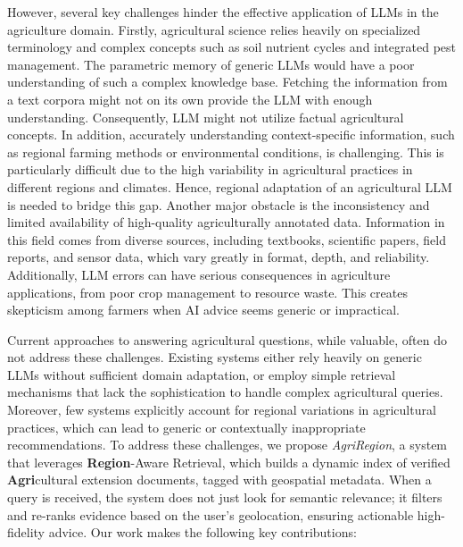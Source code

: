 \documentclass{ieeeaccess}
\newcommand{\AgriRegion}{\textit{AgriRegion}}
\begin{document}
However, several key challenges hinder the effective application of LLMs in the agriculture domain. Firstly, agricultural science relies heavily on specialized terminology and complex concepts such as soil nutrient cycles and integrated pest management. The parametric memory of generic LLMs would have a poor understanding of such a complex knowledge base. Fetching the information from a text corpora might not on its own provide the LLM with enough understanding. Consequently, LLM might not utilize factual agricultural concepts. In addition, accurately understanding context-specific information, such as regional farming methods or environmental conditions, is challenging. This is particularly difficult due to the high variability in agricultural practices in different regions and climates. Hence, regional adaptation of an agricultural LLM is needed to bridge this gap. Another major obstacle is the inconsistency and limited availability of high-quality agriculturally annotated data. Information in this field comes from diverse sources, including textbooks, scientific papers, field reports, and sensor data, which vary greatly in format, depth, and reliability. Additionally, LLM errors can have serious consequences in agriculture applications, from poor crop management to resource waste. This creates skepticism among farmers when AI advice seems generic or impractical. 

Current approaches \cite{yang2025agrigpt,yang2025agrigptvl} to answering agricultural questions, while valuable, often do not address these challenges. Existing systems either rely heavily on generic LLMs without sufficient domain adaptation, or employ simple retrieval mechanisms that lack the sophistication to handle complex agricultural queries. Moreover, few systems explicitly account for regional variations in agricultural practices, which can lead to generic or contextually inappropriate recommendations.
To address these challenges,  we propose \AgriRegion, a system that leverages \textbf{Region}-Aware Retrieval, which builds a dynamic index of verified \textbf{Agri}cultural extension documents, tagged with geospatial metadata. When a query is received, the system does not just look for semantic relevance; it filters and re-ranks evidence based on the user’s geolocation, ensuring actionable high-fidelity advice. Our work makes the following key contributions:
\end{document}
